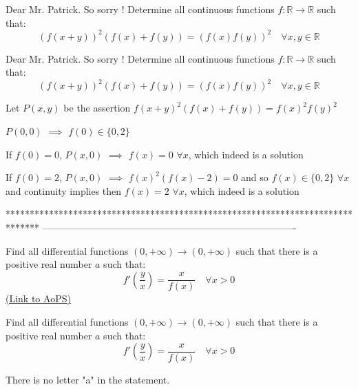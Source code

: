 \begin{solution}
	Dear Mr. Patrick. So sorry ! 
Determine all continuous functions $f: \mathbb R\to\mathbb R$ such that:
\[ (f (x + y))^2 (f (x)+f(y)) = (f (x) f (y)) ^ 2 \quad \forall x,y\in\mathbb R\]
\end{solution}



\begin{solution}
	\begin{tcolorbox}Dear Mr. Patrick. So sorry ! 
Determine all continuous functions $f: \mathbb R\to\mathbb R$ such that:
\[ (f (x + y))^2 (f (x)+f(y)) = (f (x) f (y)) ^ 2 \quad \forall x,y\in\mathbb R\]\end{tcolorbox}
Let $P(x,y)$ be the assertion $f(x+y)^2(f(x)+f(y))=f(x)^2f(y)^2$

$P(0,0)$ $\implies$ $f(0)\in\{0,2\}$

If $f(0)=0$, $P(x,0)$ $\implies$ $\boxed{f(x)=0}$ $\forall x$, which indeed is a solution

If $f(0)=2$, $P(x,0)$ $\implies$ $f(x)^2(f(x)-2)=0$ and so $f(x)\in\{0,2\}$ $\forall x$ and continuity implies then $\boxed{f(x)=2}$ $\forall x$, which indeed is a solution
\end{solution}
*******************************************************************************
-------------------------------------------------------------------------------

\begin{problem}
	Find all differential functions $(0, +\infty) \to (0, +\infty)$  such that there is a positive real number $a$ such that:
\[f '\left (\frac{y }{ x}\right) = \frac{x }{ f (x)}\quad  \forall x> 0\]
	\flushright \href{https://artofproblemsolving.com/community/c6h566571}{(Link to AoPS)}
\end{problem}



\begin{solution}
	\begin{tcolorbox}Find all differential functions $(0, +\infty) \to (0, +\infty)$  such that there is a positive real number $a$ such that:
\[f '\left (\frac{y }{ x}\right) = \frac{x }{ f (x)}\quad  \forall x> 0\]\end{tcolorbox}
There is no letter "a" in the statement.
\end{solution}



